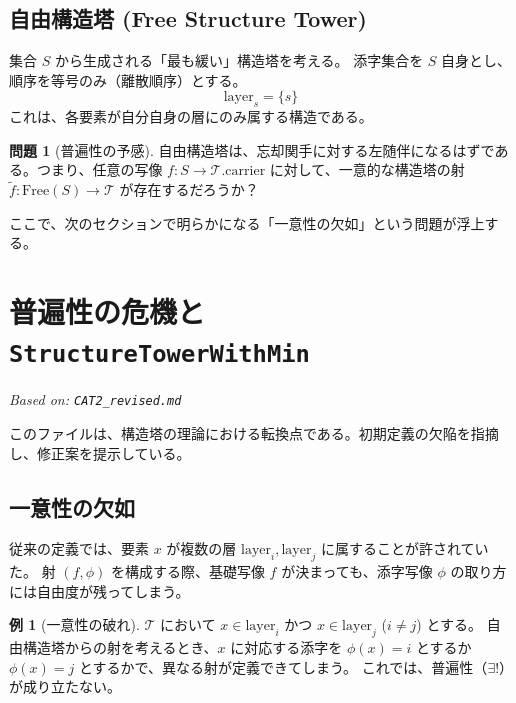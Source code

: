 \documentclass[a4paper,11pt]{ltjsarticle}
\theoremstyle{definition}
\newtheorem{example}[definition]{例}
\newtheorem{problem}[definition]{問題}
\newcommand{\Tower}{\mathcal{T}}
\newcommand{\Layer}[1]{\mathrm{layer}_{#1}}
\begin{document}
\subsection{自由構造塔 (Free Structure Tower)}
集合 $S$ から生成される「最も緩い」構造塔を考える。
添字集合を $S$ 自身とし、順序を等号のみ（離散順序）とする。
\[ \Layer{s} = \{s\} \]
これは、各要素が自分自身の層にのみ属する構造である。

\begin{problem}[普遍性の予感]
自由構造塔は、忘却関手に対する左随伴になるはずである。つまり、任意の写像 $f: S \to \Tower.\text{carrier}$ に対して、一意的な構造塔の射 $\tilde{f}: \text{Free}(S) \to \Tower$ が存在するだろうか？
\end{problem}

ここで、次のセクションで明らかになる「一意性の欠如」という問題が浮上する。

\section{普遍性の危機と \texttt{StructureTowerWithMin}}
\label{sec:cat2_revised}
\textit{Based on: \texttt{CAT2\_revised.md}}

このファイルは、構造塔の理論における転換点である。初期定義の欠陥を指摘し、修正案を提示している。

\subsection{一意性の欠如}
従来の定義では、要素 $x$ が複数の層 $\Layer{i}, \Layer{j}$ に属することが許されていた。
射 $(f, \phi)$ を構成する際、基礎写像 $f$ が決まっても、添字写像 $\phi$ の取り方には自由度が残ってしまう。

\begin{example}[一意性の破れ]
$\Tower$ において $x \in \Layer{i}$ かつ $x \in \Layer{j}$ ($i \neq j$) とする。
自由構造塔からの射を考えるとき、$x$ に対応する添字を $\phi(x) = i$ とするか $\phi(x) = j$ とするかで、異なる射が定義できてしまう。
これでは、普遍性（$\exists !$）が成り立たない。
\end{example}
\end{document}
